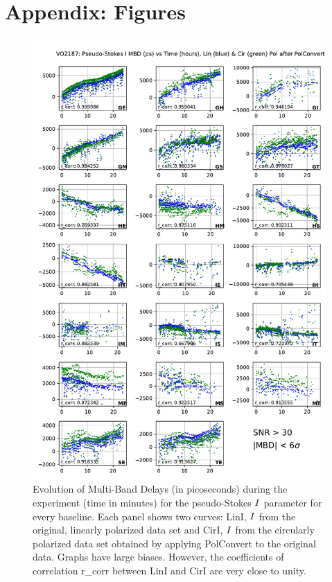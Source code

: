 \documentclass[letterpaper,twoside,12pt]{article}
\begin{document}
\cleardoublepage

\section{Appendix: Figures}


\begin{figure}[ht!]
  \begin{center}
  \includegraphics[width=33pc]{VO2187_MBD_Lin_I_and_Cir_I_SNR_floor_30.pdf}
  \caption{\small Evolution of Multi-Band Delays (in picoseconds) during the experiment (time in minutes) for the pseudo-Stokes $\protect I$ parameter for every baseline. Each panel shows two curves: LinI, $\protect I$ from the original, linearly polarized data set and CirI, $\protect I$ from the circularly polarized data set obtained by applying PolConvert to the original data. Graphs have large biases. However, the coefficients of correlation r\_corr between LinI and CirI are very close to unity.}
  \label{mbd_lin_and_cir}
  \end{center}
\end{figure}
\end{document}
